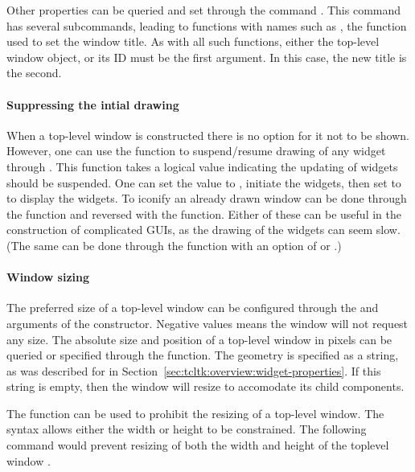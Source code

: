 Other properties can be queried and set through the \TK\/ command
. This command has several subcommands, leading to
 functions with names such as , the
function used to set the window title. As with all such functions,
either the top-level window object, or its ID must be the first
argument. In this case, the new title is the second.

\paragraph{Suppressing the intial drawing}
When a top-level window is constructed there is no option for it not
to be shown.  However, one can use the 
function to suspend/resume drawing of any widget through \TK. This
function takes a logical value indicating the updating of widgets
should be suspended. One can set the value to , initiate
the widgets, then set to  to display the widgets. To
iconify an already drawn window can be done through the
 function and reversed with the
 function. Either of these can be useful in
the construction of complicated GUIs, as the drawing of the widgets
can seem slow. (The same can be done through the 
function with an option of  or .)
 


\paragraph{Window sizing}

The preferred size of a top-level window can be configured through the
 and  arguments of the constructor.  Negative
values means the window will not request any size. The absolute size
and position of a top-level window in pixels can be queried or
specified through the  function. The geometry
is specified as a string, as was described for  in
Section~\ref{sec:tcltk:overview:widget-properties}. If this string is
empty, then the window will resize to accomodate its child components.

The  function can be used to prohibit the
resizing of a top-level window. The syntax allows either the width or
height to be constrained. The following command would  prevent
resizing of both the width and height of the toplevel window . 

